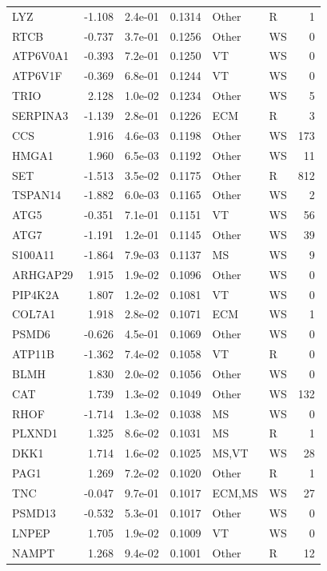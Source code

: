 \begin{table}[ht]
\begin{tabular}{lrlrllr}
  LYZ & -1.108 & 2.4e-01 & 0.1314 & Other & R & 1 \\ 
  RTCB & -0.737 & 3.7e-01 & 0.1256 & Other & WS & 0 \\ 
  ATP6V0A1 & -0.393 & 7.2e-01 & 0.1250 & VT & WS & 0 \\ 
  ATP6V1F & -0.369 & 6.8e-01 & 0.1244 & VT & WS & 0 \\ 
  TRIO & 2.128 & 1.0e-02 & 0.1234 & Other & WS & 5 \\ 
  SERPINA3 & -1.139 & 2.8e-01 & 0.1226 & ECM & R & 3 \\ 
  CCS & 1.916 & 4.6e-03 & 0.1198 & Other & WS & 173 \\ 
  HMGA1 & 1.960 & 6.5e-03 & 0.1192 & Other & WS & 11 \\ 
  SET & -1.513 & 3.5e-02 & 0.1175 & Other & R & 812 \\ 
  TSPAN14 & -1.882 & 6.0e-03 & 0.1165 & Other & WS & 2 \\ 
  ATG5 & -0.351 & 7.1e-01 & 0.1151 & VT & WS & 56 \\ 
  ATG7 & -1.191 & 1.2e-01 & 0.1145 & Other & WS & 39 \\ 
  S100A11 & -1.864 & 7.9e-03 & 0.1137 & MS & WS & 9 \\ 
  ARHGAP29 & 1.915 & 1.9e-02 & 0.1096 & Other & WS & 0 \\ 
  PIP4K2A & 1.807 & 1.2e-02 & 0.1081 & VT & WS & 0 \\ 
  COL7A1 & 1.918 & 2.8e-02 & 0.1071 & ECM & WS & 1 \\ 
  PSMD6 & -0.626 & 4.5e-01 & 0.1069 & Other & WS & 0 \\ 
  ATP11B & -1.362 & 7.4e-02 & 0.1058 & VT & R & 0 \\ 
  BLMH & 1.830 & 2.0e-02 & 0.1056 & Other & WS & 0 \\ 
  CAT & 1.739 & 1.3e-02 & 0.1049 & Other & WS & 132 \\ 
  RHOF & -1.714 & 1.3e-02 & 0.1038 & MS & WS & 0 \\ 
  PLXND1 & 1.325 & 8.6e-02 & 0.1031 & MS & R & 1 \\ 
  DKK1 & 1.714 & 1.6e-02 & 0.1025 & MS,VT & WS & 28 \\ 
  PAG1 & 1.269 & 7.2e-02 & 0.1020 & Other & R & 1 \\ 
  TNC & -0.047 & 9.7e-01 & 0.1017 & ECM,MS & WS & 27 \\ 
  PSMD13 & -0.532 & 5.3e-01 & 0.1017 & Other & WS & 0 \\ 
  LNPEP & 1.705 & 1.9e-02 & 0.1009 & VT & WS & 0 \\ 
  NAMPT & 1.268 & 9.4e-02 & 0.1001 & Other & R & 12 \\ 

\end{tabular}
\end{table}
